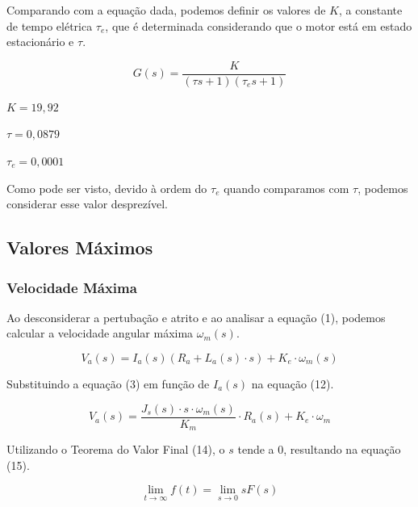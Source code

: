 \documentclass[12pt]{article}
\begin{document}
\quad Comparando com a equação dada, podemos definir os valores de $K$, a constante de tempo elétrica $\tau_e$, que é determinada considerando que o motor está em estado estacionário e $\tau$.

\begin{equation}
    G(s) = \frac{K}{(\tau s + 1)(\tau_e s + 1)}
\end{equation}

\begin{center}
    $K = 19,92$
\end{center}

\begin{center}
    $\tau = 0,0879$
\end{center}

\begin{center}
    $\tau_e = 0,0001$
\end{center}

Como pode ser visto, devido à ordem do $\tau_e$ quando comparamos com $\tau$, podemos considerar esse valor desprezível. 

\subsection{Valores Máximos}

\subsubsection{Velocidade Máxima}

\quad Ao desconsiderar a pertubação e atrito e ao analisar a equação (1), podemos calcular a velocidade angular máxima $\omega_m(s)$.

\begin{equation}
    V_a(s) = I_a(s)(R_a + L_a(s)\cdot s) + K_e \cdot \omega_m(s)
\end{equation}

\quad Substituindo a equação (3) em função de $I_a(s)$ na equação (12).

\begin{equation}
V_a (s) = \frac{J_s(s) \cdot s \cdot \omega_m(s)}{K_m}\cdot R_a(s) + K_e \cdot \omega_m    
\end{equation}

\quad Utilizando o Teorema do Valor Final (14), o $s$ tende a 0, resultando na equação (15).

\begin{equation}
    \lim_{t \to \infty} f(t) = \lim_{s \to 0} sF(s)
\end{equation}
\end{document}
